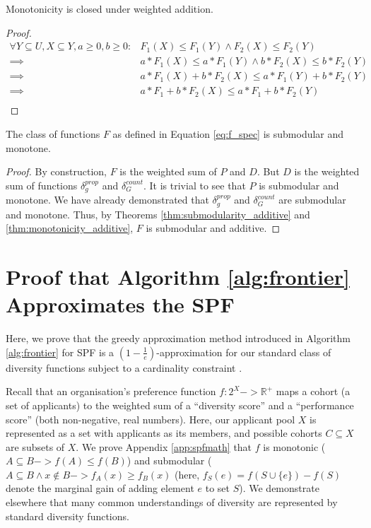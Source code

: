     \begin{theorem} 
    Monotonicity is closed under weighted addition. \label{thm:monotonicity_additive}
    \end{theorem}
    \begin{proof}
    \begin{equation}
        \label{eq:mononicity_additive}
        \begin{split}
            \forall Y \subseteq U, X \subseteq Y, a \geq 0, b \geq 0: & F_1(X)\leq F_1(Y) \land F_2(X)\leq F_2(Y) \\
            \implies & a*F_1(X)\leq a*F_1(Y) \land b*F_2(X)\leq b*F_2(Y) \\
            \implies & a*F_1(X) + b*F_2(X) \leq a*F_1(Y) + b*F_2(Y) \\
            \implies & a*F_1+b*F_2(X) \leq a*F_1+b*F_2(Y) \\ \nonumber
        \end{split}
    \end{equation}
    \end{proof}
    
    \begin{theorem} 
    The class of functions $F$ as defined in Equation \ref{eq:f_spec} is submodular and monotone.\label{thm:f_sub_mon}
    \end{theorem}
    \begin{proof}
    By construction, $F$ is the weighted sum of $P$ and $D$. But $D$ is the weighted sum of functions $\delta_g^{prop}$ and $\delta_G^{count}$.
    It is trivial to see that $P$ is submodular and monotone. We have already demonstrated that $\delta_g^{prop}$ and $\delta_G^{count}$ are submodular and monotone. Thus, by Theorems \ref{thm:submodularity_additive} and \ref{thm:monotonicity_additive}, $F$ is submodular and additive.
    \end{proof}

\section{Proof that Algorithm \ref{alg:frontier} Approximates the SPF}\label{app:greedy-proof}
Here, we prove that the greedy approximation method introduced in Algorithm \ref{alg:frontier} for SPF is a $(1-\frac{1}{e})$-approximation for our standard class of diversity functions subject to a cardinality constraint \cite{nemhauser1978analysis}.

Recall that an organisation's preference function $f: 2^X -> \mathbb{R}^+$  maps a cohort (a set of applicants) to the weighted sum of a ``diversity score'' and a ``performance score'' (both non-negative, real numbers). Here, our applicant pool $X$ is represented as a set with applicants as its members, and possible cohorts $C \subseteq X$ are subsets of $X$. We prove Appendix \ref{app:spfmath} that $f$ is monotonic ($A \subseteq B -> f(A) \leq f(B)$) and submodular ($A \subseteq B \land x \notin B -> f_A(x) \geq f_B(x)$ (here, $f_S(e) = f(S \cup \{e\}) - f(S)$ denote the marginal gain of adding element $e$ to set $S$). We demonstrate elsewhere that many common understandings of diversity are represented by standard diversity functions.


